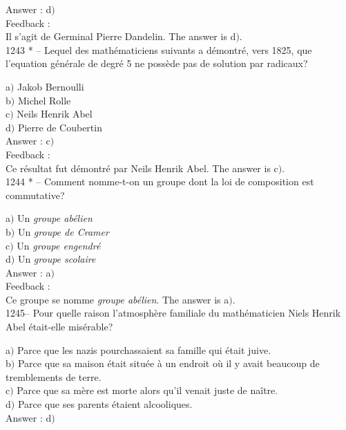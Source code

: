 \documentclass[letterpaper, 12pt]{article}
\begin{document}
Answer : d$)$\\

Feedback : \\
Il s'agit de Germinal Pierre Dandelin.
The answer is d$)$.\\

1243 * -- Lequel des math\'ematiciens suivants a d\'emontr\'e, vers
1825, que l'equation g\'en\'erale de degr\'e 5 ne poss\`ede pas de
solution par radicaux?

a$)$ Jakob Bernoulli  \\
b$)$ Michel Rolle \\
c$)$ Neils Henrik Abel \\
d$)$ Pierre de Coubertin\\

Answer : c$)$\\

Feedback : \\
Ce r\'esultat fut d\'emontr\'e par Neils Henrik Abel.
The answer is c$)$.\\

1244 * -- Comment nomme-t-on un groupe dont la loi de composition
est commutative?

a$)$ Un {\sl groupe ab\'elien}  \\
b$)$ Un {\sl groupe de Cramer} \\
c$)$ Un {\sl groupe engendr\'e} \\
d$)$ Un {\sl groupe scolaire}\\

Answer : a$)$\\

Feedback : \\
Ce groupe se nomme {\sl groupe ab\'elien}.
The answer is a$)$.\\

1245-- Pour quelle raison l'atmosph\`ere familiale du
math\'ematicien Niels Henrik Abel \'etait-elle mis\'erable?

a$)$ Parce que les nazis pourchassaient sa famille qui \'etait juive. \\
b$)$ Parce que sa maison \'etait situ\'ee \`a un endroit o\`u il y avait
beaucoup de tremblements de terre. \\
c$)$ Parce que sa m\`ere est morte alors qu'il venait juste de na\^itre. \\
d$)$ Parce que ses parents \'etaient alcooliques.  \\

Answer : d$)$\\
\end{document}
